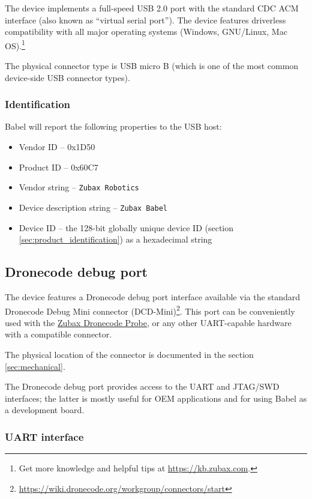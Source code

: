 \documentclass{zubaxdoc}
\begin{document}
The device implements a full-speed USB 2.0 port with the standard CDC ACM interface
(also known as ``virtual serial port'').
The device features driverless compatibility with all major operating systems
(Windows, GNU/Linux, Mac OS).\footnote{Get more knowledge and helpful tips at \url{https://kb.zubax.com}.}

The physical connector type is USB micro B (which is one of the most common device-side USB connector types).

\subsubsection{Identification}

Babel will report the following properties to the USB host:
\begin{itemize}
    \item Vendor ID -- 0x1D50
    \item Product ID -- 0x60C7
    \item Vendor string -- \verb|Zubax Robotics|
    \item Device description string -- \verb|Zubax Babel|
    \item Device ID -- the 128-bit globally unique device ID (section \ref{sec:product_identification})
                       as a hexadecimal string
\end{itemize}

\subsection{Dronecode debug port}\label{sec:dronecode_debug_port}

The device features a Dronecode debug port interface available via the standard
Dronecode Debug Mini connector (DCD-Mini)\footnote{\url{https://wiki.dronecode.org/workgroup/connectors/start}}.
This port can be conveniently used with the \href{https://kb.zubax.com/x/iIAh}{Zubax Dronecode Probe},
or any other UART-capable hardware with a compatible connector.

The physical location of the connector is documented in the section \ref{sec:mechanical}.

The Dronecode debug port provides access to the UART and JTAG/SWD interfaces;
the latter is mostly useful for OEM applications and for using Babel as a development board.

\subsubsection{UART interface}
\end{document}

